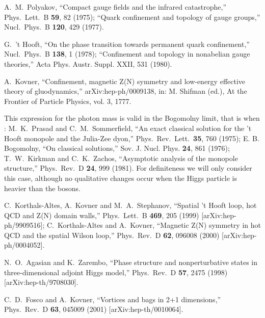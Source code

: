 \documentclass[a4paper,aps,prd,superscriptaddress,showpacs,showkeys]{revtex4}
\begin{document}
\begin{thebibliography}{99}
A.~M.~Polyakov,
``Compact gauge fields and the infrared catastrophe,''
Phys.\ Lett.\ B {\bf 59}, 82 (1975);
``Quark confinement and topology of gauge groups,''
Nucl.\ Phys.\ B {\bf 120}, 429 (1977).

G.~'t Hooft,
``On the phase transition towards permanent quark
confinement,''
Nucl.\ Phys.\ B {\bf 138}, 1 (1978);
``Confinement and topology in nonabelian gauge theories,''
Acta Phys. Austr. Suppl. XXII, 531 (1980).

A.~Kovner,
``Confinement, magnetic Z(N) symmetry and low-energy effective theory of
gluodynamics,'' 
arXiv:hep-ph/{}0009138,
in: M. Shifman (ed.), At the
Frontier of Particle Physics, vol. 3, 1777.

This expression for the photon mass is valid in the Bogomolny
limit, that is when \coordHE{}: 
M.~K.~Prasad and C.~M.~Sommerfield, 
``An exact classical solution for the 't Hooft
monopole and the Julia-Zee dyon,'' 
Phys.\ Rev.\ Lett.\  {\bf 35}, 760 (1975);
E. B. Bogomolny, 
``On classical solutions,'' 
Sov. J. Nucl. Phys. {\bf 24}, 861 (1976);
T.~W.~Kirkman and C.~K.~Zachos,
``Asymptotic analysis of the monopole structure,''
Phys.\ Rev.\ D {\bf 24}, 999 (1981).
For definiteness we will only
consider this case, although no qualitative changes occur when the
Higgs particle is heavier than the \coordHE{} bosons.

C.~Korthals-Altes, A.~Kovner and M.~A.~Stephanov,
``Spatial 't Hooft loop, hot QCD and Z(N) domain walls,''
Phys.\ Lett.\ B {\bf 469}, 205 (1999)
[arXiv:hep-ph/9909516];
C.~Korthals-Altes and A.~Kovner,
``Magnetic Z(N) symmetry in hot QCD and the spatial Wilson loop,''
Phys.\ Rev.\ D {\bf 62}, 096008 (2000)
[arXiv:hep-ph/0004052].

N.~O.~Agasian and K.~Zarembo,
``Phase structure and nonperturbative states in three-dimensional adjoint
Higgs model,'' 
Phys.\ Rev.\ D {\bf 57}, 2475 (1998)
[arXiv:hep-th/9708030].

C.~D.~Fosco and A.~Kovner,
``Vortices and bags in 2+1 dimensions,''
Phys.\ Rev.\ D {\bf 63}, 045009 (2001)
[arXiv:hep-th/0010064].


\end{thebibliography}
\end{document}
